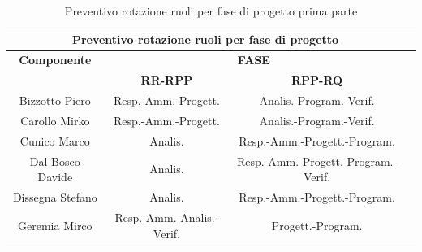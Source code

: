 \begin{table}[!h]
	\begin{center}
		  \begin{tabular}
			  {|c|c|c|c|}
		 \hline
			\multicolumn{3}{|c|}{ \textbf{Preventivo rotazione ruoli per fase di progetto} } \\
			\hline
			\textbf{Componente} & \multicolumn{2}{|c|}{ \textbf{FASE} } \\
			\hline
			& \textbf{RR-RPP} & \textbf{RPP-RQ} \\
			\hline
			Bizzotto Piero & Resp.-Amm.-Progett.  & Analis.-Program.-Verif. \\
			\hline
			Carollo Mirko & Resp.-Amm.-Progett.  & Analis.-Program.-Verif.   \\
			\hline
			Cunico Marco & Analis.  & Resp.-Amm.-Progett.-Program.  \\
			\hline
			Dal Bosco Davide & Analis.  & Resp.-Amm.-Progett.-Program.-Verif.  \\
			\hline
			Dissegna Stefano & Analis.  & Resp.-Amm.-Progett.-Program.  \\
			\hline
			Geremia Mirco & Resp.-Amm.-Analis.-Verif.  & Progett.-Program.  \\
			\hline

		\end{tabular}
	\caption{Preventivo rotazione ruoli per fase di progetto prima parte} %
	\end{center}	
\end{table}
